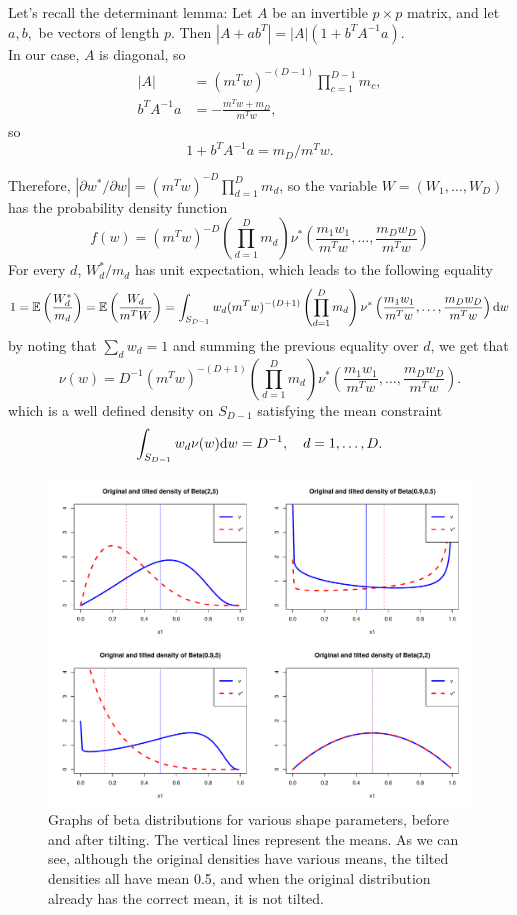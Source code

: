 \documentclass[10pt]{report}
\begin{document}
Let's recall the determinant lemma:
Let $A$ be an invertible $ p \times p $ matrix, and let $a,b,$ be vectors of length $p$.
Then $|A + ab^T| = |A|(1 + b^TA^{-1}a)$. \\

In our case, $A$ is diagonal, so
\begin{align*}
|A| &= (m^Tw)^{-(D-1)} \prod_{c=1}^{D-1}m_c , \\
b^TA^{-1}a &= -\frac{m^Tw + m_D}{m^Tw},
\end{align*}
so 
$$1 + b^TA^{-1}a = m_D/m^Tw.$$

Therefore, $|\partial w^*/\partial w| = (m^Tw)^{-D} \prod_{d=1}^Dm_d$, so the variable $W=(W_1,\ldots,W_D)$ has the probability density function
$$
f(w) = (m^Tw)^{-D} \left(\prod_{d=1}^D m_d\right) \nu^* \left(\frac{m_1w_1}{m^Tw},\ldots,\frac{m_Dw_D}{m^Tw}\right)
$$
For every $d$, $W_d^*/m_d$ has unit expectation, which leads to the following equality
$$
1 = \mathbb{E} \left( \frac{W_d^*}{m_d} \right) = \mathbb{E} \left( \frac{W_d}{m^TW} \right)
= \int_{S_{D-1}} w_d (m^Tw)^{-(D+1)} \left(\prod^D_{d=1} m_d \right) \nu^* \left(\frac{m_1w_1}{m^Tw},\ldots,\frac{m_Dw_D}{m^Tw}\right) {\rm d}w
$$
by noting that $\sum_d w_d = 1$ and summing the previous equality over $d$, we get that
$$
\nu (w) = D^{-1}(m^Tw)^{-(D+1)} \left(\prod_{d=1}^D m_d\right) \nu^* \left(\frac{m_1w_1}{m^Tw},\ldots,\frac{m_Dw_D}{m^Tw}\right).
$$
which is a well defined density on $S_{D-1}$ satisfying the mean constraint
$$
\int_{S_{D-1}} w_d \nu (w) {\rm d}w = D^{-1}, \quad d=1,\ldots,D.
$$

\begin{figure}[h]
\centering
\includegraphics[width=\textwidth]{density_tilt.pdf}
\caption{Graphs of beta distributions for various shape parameters, before and after tilting. The vertical lines represent the means. As we can see, although the original densities have various means, the tilted densities all have mean 0.5, and when the original distribution already has the correct mean, it is not tilted.}
\label{fig:density_tilt}
\end{figure}
\end{document}
